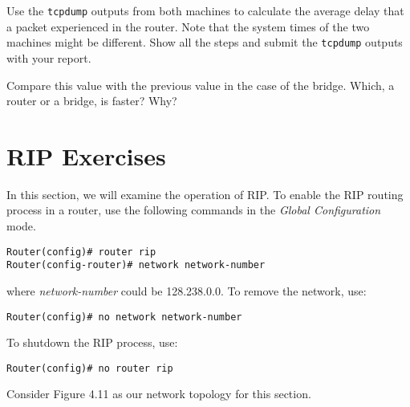 \documentclass{../UTNetLab}
\begin{document}
    \begin{report}
    \item Use the \lstinline{tcpdump} outputs from both machines to calculate the average delay that a packet experienced in the router. Note that the system times of the two machines might be different. Show all the steps and submit the \lstinline{tcpdump} outputs with your report.
    
    \item Compare this value with the previous value in the case of the bridge. Which, a router or a bridge, is faster? Why?
    \end{report}


\part{RIP Exercises}
    In this section, we will examine the operation of RIP. To enable the RIP routing process in a router, use the following commands in the \textit{Global Configuration} mode.
    \begin{lstlisting}[language={cisco}, emph={network-number}]
Router(config)# router rip
Router(config-router)# network network-number
    \end{lstlisting}
    where \textit{network-number} could be 128.238.0.0.
    To remove the network, use:
    \begin{lstlisting}[language={cisco}, emph={network-number}]
Router(config)# no network network-number
    \end{lstlisting}
    To shutdown the RIP process, use:
    \begin{lstlisting}[language={cisco}]
Router(config)# no router rip
    \end{lstlisting}
    Consider Figure 4.11 as our network topology for this section.
    
\end{document}
